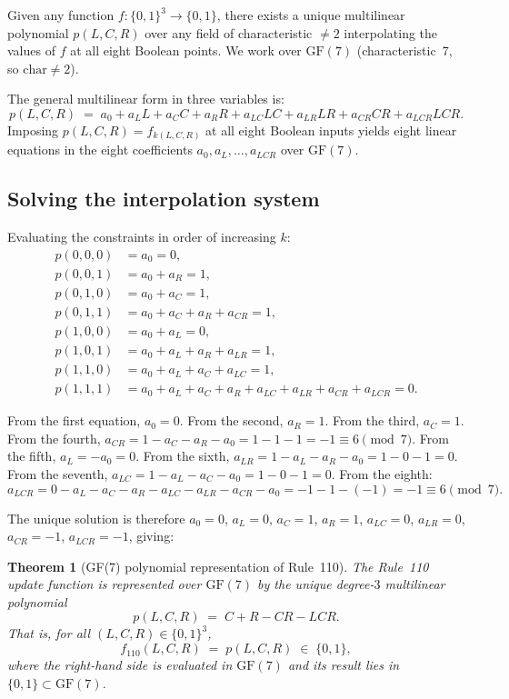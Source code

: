 \documentclass[11pt]{article}
\newtheorem{theorem}{Theorem}[section]
\theoremstyle{remark}
\begin{document}
Given any function $f : \{0,1\}^3 \to \{0,1\}$, there exists a unique
multilinear polynomial $p(L,C,R)$ over any field of characteristic $\neq 2$
interpolating the values of $f$ at all eight Boolean points.
We work over $\mathrm{GF}(7)$ (characteristic~7, so $\mathrm{char} \neq 2$).

The general multilinear form in three variables is:
\[
  p(L,C,R) \;=\; a_0 + a_L L + a_C C + a_R R + a_{LC} LC + a_{LR} LR + a_{CR} CR + a_{LCR} LCR.
\]
Imposing $p(L,C,R) = f_{k(L,C,R)}$ at all eight Boolean inputs yields eight linear
equations in the eight coefficients $a_0, a_L, \ldots, a_{LCR}$ over $\mathrm{GF}(7)$.

\subsection{Solving the interpolation system}

Evaluating the constraints in order of increasing $k$:
\begin{align*}
p(0,0,0) &= a_0 = 0, \\
p(0,0,1) &= a_0 + a_R = 1, \\
p(0,1,0) &= a_0 + a_C = 1, \\
p(0,1,1) &= a_0 + a_C + a_R + a_{CR} = 1, \\
p(1,0,0) &= a_0 + a_L = 0, \\
p(1,0,1) &= a_0 + a_L + a_R + a_{LR} = 1, \\
p(1,1,0) &= a_0 + a_L + a_C + a_{LC} = 1, \\
p(1,1,1) &= a_0 + a_L + a_C + a_R + a_{LC} + a_{LR} + a_{CR} + a_{LCR} = 0.
\end{align*}

From the first equation, $a_0 = 0$.
From the second, $a_R = 1$.
From the third, $a_C = 1$.
From the fourth, $a_{CR} = 1 - a_C - a_R - a_0 = 1 - 1 - 1 = -1 \equiv 6 \pmod{7}$.
From the fifth, $a_L = -a_0 = 0$.
From the sixth, $a_{LR} = 1 - a_L - a_R - a_0 = 1 - 0 - 1 = 0$.
From the seventh, $a_{LC} = 1 - a_L - a_C - a_0 = 1 - 0 - 1 = 0$.
From the eighth:
\[
  a_{LCR} = 0 - a_L - a_C - a_R - a_{LC} - a_{LR} - a_{CR} - a_0
           = -1 - 1 - (-1) = -1 \equiv 6 \pmod{7}.
\]

The unique solution is therefore $a_0 = 0$, $a_L = 0$, $a_C = 1$, $a_R = 1$,
$a_{LC} = 0$, $a_{LR} = 0$, $a_{CR} = -1$, $a_{LCR} = -1$, giving:

\begin{theorem}[GF(7) polynomial representation of Rule~110]
\label{thm:poly}
The Rule~110 update function is represented over $\mathrm{GF}(7)$ by the unique
degree-$3$ multilinear polynomial
\[
  p(L,C,R) \;=\; C + R - CR - LCR.
\]
That is, for all $(L,C,R) \in \{0,1\}^3$,
\[
  f_{110}(L,C,R) \;=\; p(L,C,R) \;\in\; \{0,1\},
\]
where the right-hand side is evaluated in $\mathrm{GF}(7)$ and its result lies in
$\{0,1\} \subset \mathrm{GF}(7)$.
\end{theorem}
\end{document}
